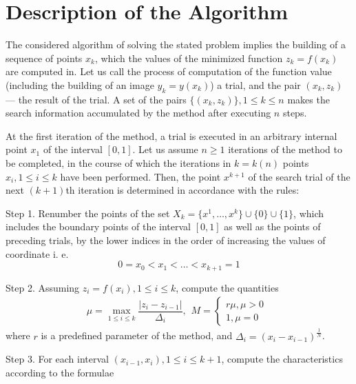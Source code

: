 \documentclass[procedia]{easychair}
\begin{document}
\section{Description of the Algorithm}
\label{sect:algorithm}

The considered algorithm of solving the stated problem implies the building of
a sequence of points \(x_k\), which the values of the minimized function \(z_k = f(x_k)\)
are computed in. Let us call the process of computation of the function value
(including the building of an image \(y_k=y(x_k)\)) a trial, and the pair \((x_k,z_k)\) ---
the result of the trial. A set of the pairs \(\{(x_k,z_k)\}, 1\leqslant k\leqslant n\)
makes the search information accumulated by the method after executing \(n\) steps.
\par
At the first iteration of the method, a trial is executed in an arbitrary internal
point \(x_1\) of the interval \([0,1]\). Let us assume \(n \geqslant 1\) iterations
of the method to be completed, in the course of which the iterations in \(k = k(n)\)
points \(x_i, 1\leqslant i\leqslant k\) have been performed. Then, the point \(x^{k+1}\)
of the search trial of the next \((k+1)\)th iteration is determined in accordance with the rules:
\par
Step 1. Renumber the points of the set \(X_k=\{x^1,\dotsc,x^k\}\cup\{0\}\cup\{1\}\),
which includes the boundary points of the interval \([0,1]\) as well as the points of
preceding trials, by the lower indices in the order of increasing the values of coordinate i. e.
\begin{displaymath}
0=x_0<x_1<\dotsc<x_{k+1}=1
\end{displaymath}
\par
Step 2. Assuming \(z_i=f(x_i),1\leqslant i\leqslant k\), compute the quantities
\begin{equation}
\label{step2}
\mu=\max_{1\leqslant i\leqslant k}\dfrac{|z_i-z_{i-1}|}{\Delta_i},
\begin{matrix}
    M =
    \left\{
    \begin{matrix}
    r\mu,\mu>0 \\
    1,\mu=0
    \end{matrix} \right.
    \end{matrix}
\end{equation}
where \(r\) is a predefined parameter of the method, and \(\Delta_i=(x_i-x_{i-1})^\frac{1}{N}\).
\par
Step 3. For each interval \((x_{i-1},x_i),1\leqslant i\leqslant k+1\), compute the
characteristics according to the formulae
\end{document}
